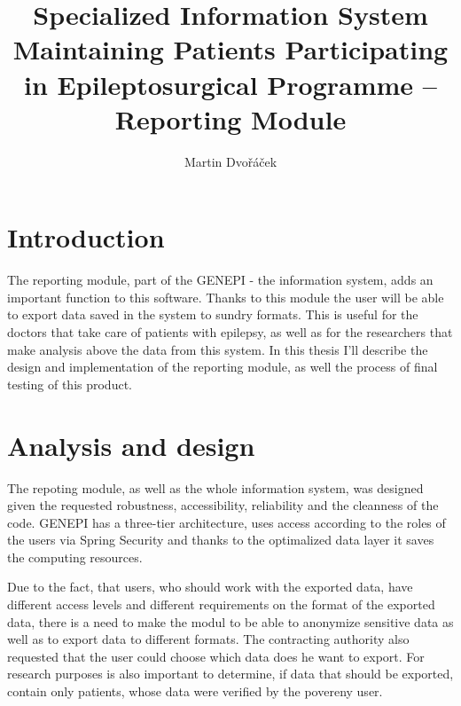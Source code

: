 \documentclass[thesis=B,english]{FITthesis}[2012/10/20]
\title{Specialized Information System Maintaining Patients Participating in Epileptosurgical Programme – Reporting Module}
\author{Martin Dvořáček} %
\begin{document}

\chapter{Introduction}
The reporting module, part of the GENEPI - the information system, adds an important function to this software. Thanks to this module the user will be able to export data saved in the system to sundry formats. This is useful for the doctors that take care of patients with epilepsy, as well as for the researchers that make analysis above the data from this system. In this thesis I'll describe the design and implementation of the reporting module, as well the process of final testing of this product.

\chapter{Analysis and design}
The repoting module, as well as the whole information system, was designed given the requested robustness, accessibility, reliability and the cleanness of the code. GENEPI has a three-tier architecture, uses access according to the roles of the users via Spring Security and thanks to the optimalized data layer it saves the computing resources.

Due to the fact, that users, who should work with the exported data, have different access levels and different requirements on the format of the exported data, there is a need to make the modul to be able to anonymize sensitive data as well as to export data to different formats. The contracting authority also requested that the user could choose which data does he want to export. For research purposes is also important to determine, if data that should be exported, contain only patients, whose data were verified by the povereny user.
\end{document}
